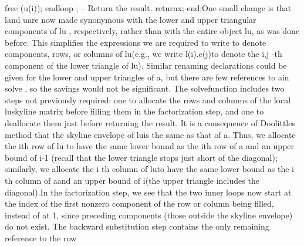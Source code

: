       free (u(i));
   \tyxtstxbf[]end\tyxtstxendbf[] \tyxtstxbf[]loop%
\tyxtstxendbf[];
   -- Return the result.
   \tyxtstxbf[]return\tyxtstxendbf[] x;
\tyxtstxbf[]end\tyxtstxendbf[];\Endcomp[]
\EndParbox[]
\FgEndblock[]
 One small change is that \tyxffmxmono[]l\tyxffmxendmono[] and %
\tyxffmxmono[]u\tyxffmxendmono[] are now made synonymous with the
lower and upper triangular components of \tyxffmxmono[]lu%
\tyxffmxendmono[], respectively, rather than with the entire object
\tyxffmxmono[]lu\tyxffmxendmono[], as was done before. This simplifies
the expressions we are required to write to denote components, rows,
or columns of \tyxffmxmono[]lu\tyxffmxendmono[] (e.g., we write %
\tyxffmxmono[]l(i).e(j)\tyxffmxendmono[] to denote the %
\tyxffmxmono[]i\tyxffmxendmono[],\tyxffmxmono[]j%
\tyxffmxendmono[]-th component of the lower triangle of %
\tyxffmxmono[]lu\tyxffmxendmono[]). Similar renaming declarations
could be given for the lower and upper triangles of %
\tyxffmxmono[]a\tyxffmxendmono[], but there are few references to
\tyxffmxmono[]a\tyxffmxendmono[] in \tyxffmxmono[]solve%
\tyxffmxendmono[], so the savings would not be significant. The %
\tyxffmxmono[]solve\tyxffmxendmono[] function includes two steps not
previously required: one to allocate the rows and columns of the local
\tyxffmxmono[]lu\tyxffmxendmono[] skyline matrix before filling them
in the factorization step, and one to deallocate them just before
returning the result. It is a consequence of Doolittle\rsquo[]s method
that the skyline envelope of \tyxffmxmono[]lu\tyxffmxendmono[] is
the same as that of \tyxffmxmono[]a\tyxffmxendmono[]. Thus, we allocate
the \tyxffmxmono[]i\tyxffmxendmono[]th row of \tyxffmxmono[]lu%
\tyxffmxendmono[] to have the same lower bound as the %
\tyxffmxmono[]i\tyxffmxendmono[]th row of \tyxffmxmono[]a%
\tyxffmxendmono[] and an upper bound of \tyxffmxmono[]i-1%
\tyxffmxendmono[] (recall that the lower triangle stops just short
of the diagonal); similarly, we allocate the \tyxffmxmono[]i%
\tyxffmxendmono[]th column of \tyxffmxmono[]lu\tyxffmxendmono[] to
have the same lower bound as the \tyxffmxmono[]i%
\tyxffmxendmono[]th column of \tyxffmxmono[]a\tyxffmxendmono[] and
an upper bound of \tyxffmxmono[]i\tyxffmxendmono[] (the upper triangle
includes the diagonal).\Endpara[]
\Para[]In the factorization step, we see that the two inner loops
now start at the index of the first nonzero component of the row or
column being filled, instead of at 1, since preceding components (those
outside the skyline envelope) do not exist. The backward substitution
step contains the only remaining reference to the \tyxffmxmono[]row%
